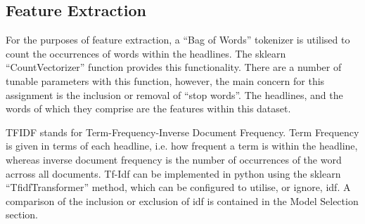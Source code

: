 \subsection{Feature Extraction}

For the purposes of feature extraction, a ``Bag of Words'' tokenizer is utilised
to count the occurrences of words within the headlines. The sklearn
``CountVectorizer'' function provides this functionality\cite{skcntVect}. There are a number of
tunable parameters with this function, however, the main concern for this
assignment is the inclusion or removal of ``stop words''. The headlines, and the
words of which they comprise are the features within this dataset.

\par TFIDF stands for Term-Frequency-Inverse Document Frequency. Term Frequency
is given in terms of each headline, i.e. how frequent a term is within the
headline, whereas inverse document frequency is the number of occurrences of the
word acrross all documents. Tf-Idf can be implemented in python using the
sklearn ``TfidfTransformer'' method, which can be configured to utilise, or
ignore, idf. A comparison of the inclusion or exclusion of idf is contained in
the Model Selection section.
